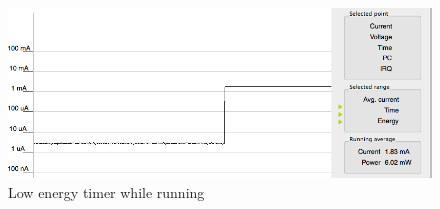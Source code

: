 \begin{figure}[H]
  \centering
  \includegraphics[clip, trim=0cm 0cm 0cm 0cm, width=12cm]{fig/marioEnergy.png}
  \caption{Low energy timer while running}
\end{figure}
